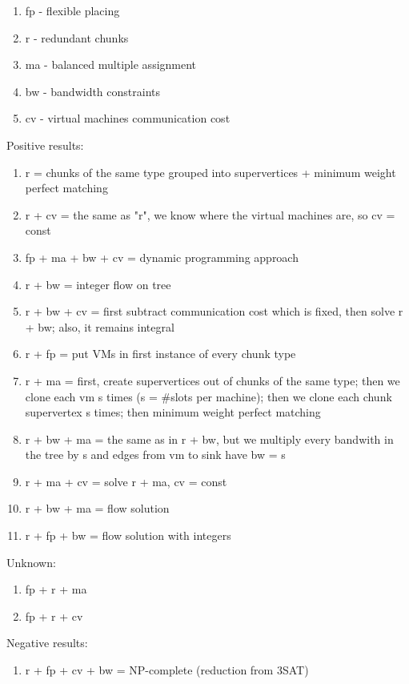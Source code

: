 \begin{enumerate}
\item fp - flexible placing
\item r - redundant chunks
\item ma - balanced multiple assignment
\item bw - bandwidth constraints
\item cv - virtual machines communication cost
\end{enumerate}

Positive results:

\begin{enumerate}
\item r = chunks of the same type grouped into supervertices + minimum weight perfect matching
\item r + cv = the same as "r", we know where the virtual machines are, so cv = const
\item fp + ma + bw + cv = dynamic programming approach
\item r + bw = integer flow on tree
\item r + bw + cv = first subtract communication cost which is fixed, then solve r + bw; also, it remains integral
\item r + fp = put VMs in first instance of every chunk type
\item r + ma = first, create supervertices out of chunks of the same type; then we clone each vm s times (s = \#slots per machine); then we clone each chunk supervertex s times; then minimum weight perfect matching
\item r + bw + ma = the same as in r + bw, but we multiply every bandwith in the tree by s and edges from vm to sink have bw = s
\item r + ma + cv = solve r + ma, cv = const
\item r + bw + ma = flow solution
\item r + fp + bw = flow solution with integers
\end{enumerate}

Unknown:

\begin{enumerate}
\item fp + r + ma
\item fp + r + cv
\end{enumerate}

Negative results:

\begin{enumerate}
\item r + fp + cv + bw = NP-complete (reduction from 3SAT)
\end{enumerate}